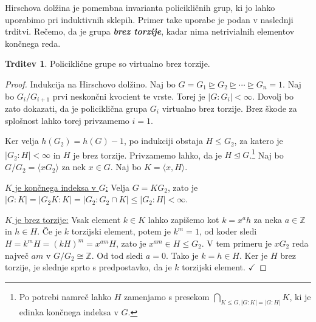 \documentclass[11pt]{book}
\def\ZZ{\mathbb{Z}}
\def\definicija{\color{rdeca}\bf\em}
\def\kljuka{$\checkmark$}
\theoremstyle{definition}
\theoremstyle{zgled}
\theoremstyle{odprtproblem}
\theoremstyle{domacanaloga}
\newenvironment{dokaz}
    {\color{siva}\begin{proof}}
    {\end{proof}}
\theoremstyle{izrek}
\newtheorem*{trditev}{Trditev}
\begin{document}
Hirschova dolžina je pomembna invarianta policikličnih grup, ki jo lahko uporabimo pri induktivnih sklepih. Primer take uporabe je podan v naslednji trditvi. Rečemo, da je grupa {\definicija brez torzije}, kadar nima netrivialnih elementov končnega reda.

\begin{trditev}
Policiklične grupe so virtualno brez torzije.
\end{trditev}

\begin{dokaz}
Indukcija na Hirschovo dolžino. Naj bo $G = G_1 \unrhd G_2 \unrhd \cdots \unrhd G_n = 1$. Naj bo $G_i/G_{i+1}$ prvi neskončni kvocient te vrste. Torej je $|G:G_i| < \infty$. Dovolj bo zato dokazati, da je policiklična grupa $G_i$ virtualno brez torzije. Brez škode za splošnost lahko torej privzamemo $i = 1$. 

Ker velja $h(G_2) = h(G) - 1$, po indukciji obstaja $H \leq G_2$, za katero je $|G_2 : H| < \infty$ in $H$ je brez torzije. Privzamemo lahko, da je $H \unlhd G$.\footnote{Po potrebi namreč lahko $H$ zamenjamo s presekom $\bigcap_{K \leq G, |G:K|=|G:H|} K$, ki je edinka končnega indeksa v $G$.} Naj bo $G/G_2 = \langle x G_2 \rangle$ za nek $x \in G$. Naj bo $K = \langle x,H \rangle$. 

\begin{figure}[h]
\centering
{}
\end{figure}

\underline{$K$ je končnega indeksa v $G$:} Velja $G = K G_2$, zato je $|G:K| = |G_2K : K| = |G_2 : G_2 \cap K| \leq |G_2 : H| < \infty$.

\underline{$K$ je brez torzije:} Vsak element $k \in K$ lahko zapišemo kot $k = x^a h$ za neka $a \in \ZZ$ in $h \in H$. Če je $k$ torzijski element, potem je $k^m = 1$, od koder sledi $H = k^m H = (kH)^m = x^{am} H$, zato je $x^{am} \in H \leq G_2$. V tem primeru je $xG_2$ reda največ $am$ v $G/G_2 \cong \ZZ$. Od tod sledi $a = 0$. Tako je $k = h \in H$. Ker je $H$ brez torzije, je slednje sprto s predpostavko, da je $k$ torzijski element. \kljuka
\end{dokaz}
\end{document}
